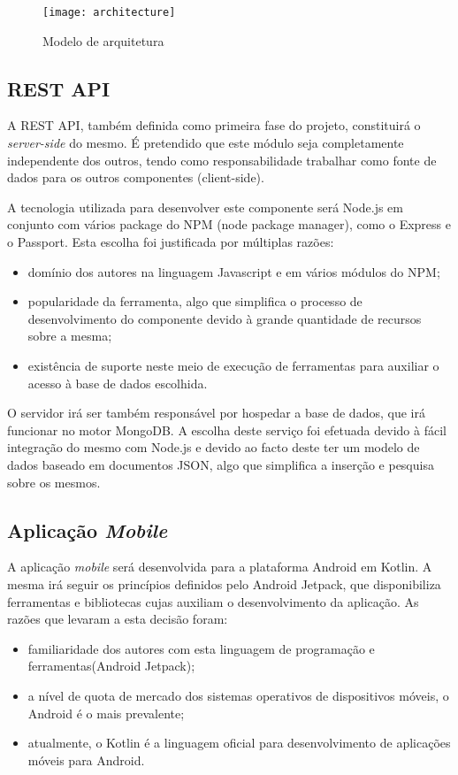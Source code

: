 \begin{figure}[h]
	\centering
	\texttt{[image: architecture]}
	\caption{Modelo de arquitetura}
\end{figure}


\subsection{REST API}
A REST API, também definida como primeira fase do projeto, constituirá o \textit{server-side} do mesmo. É pretendido que este módulo seja completamente independente dos outros, tendo como responsabilidade trabalhar como fonte de dados para os outros componentes (client-side). \par \medskip 

A tecnologia utilizada para desenvolver este componente será Node.js em conjunto com vários package do NPM (node package manager), como o Express e o Passport. Esta escolha foi justificada por múltiplas razões:
\begin{itemize}
	\item domínio dos autores na linguagem Javascript e em vários módulos do NPM;
	\item popularidade da ferramenta, algo que simplifica o processo de desenvolvimento do componente devido à grande quantidade de recursos sobre a mesma;
	\item existência de suporte neste meio de execução de ferramentas para auxiliar o acesso à base de dados escolhida.
\end{itemize}
\par \medskip

O servidor irá ser também responsável por hospedar a base de dados, que irá funcionar no motor MongoDB. A escolha deste serviço foi efetuada devido à fácil integração do mesmo com Node.js e devido ao facto deste ter um modelo de dados baseado em documentos JSON, algo que simplifica a inserção e pesquisa sobre os mesmos.
\par \medskip

\subsection{Aplicação \textit{Mobile}}
A aplicação \textit{mobile} será desenvolvida para a plataforma Android em Kotlin. A mesma irá seguir os princípios definidos pelo Android Jetpack, que disponibiliza ferramentas e bibliotecas cujas auxiliam o desenvolvimento da aplicação. As razões que levaram a esta decisão foram:
\begin{itemize}
	\item familiaridade dos autores com esta linguagem de programação e ferramentas(Android Jetpack);
	\item a nível de quota de mercado dos sistemas operativos de dispositivos móveis, o Android é o mais prevalente;
	\item atualmente, o Kotlin é a linguagem oficial para desenvolvimento de aplicações móveis para Android.
\end{itemize}

